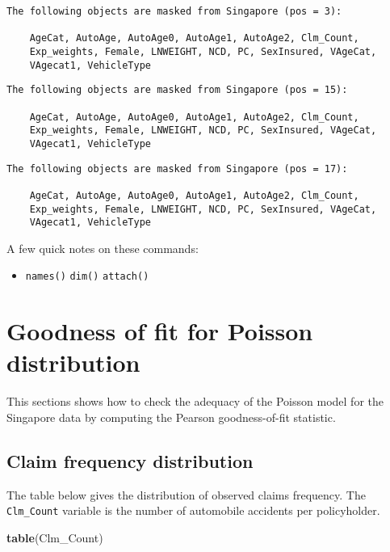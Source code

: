\documentclass[]{book}
\newenvironment{Shaded}{\begin{snugshade}}{\end{snugshade}}
\newcommand{\KeywordTok}[1]{\textcolor[rgb]{0.13,0.29,0.53}{\textbf{#1}}}
\newcommand{\NormalTok}[1]{#1}
\providecommand{\tightlist}{%
  \setlength{\itemsep}{0pt}\setlength{\parskip}{0pt}}
\theoremstyle{definition}
\theoremstyle{definition}
\theoremstyle{definition}
\theoremstyle{remark}
\begin{document}
\begin{verbatim}
The following objects are masked from Singapore (pos = 3):

    AgeCat, AutoAge, AutoAge0, AutoAge1, AutoAge2, Clm_Count,
    Exp_weights, Female, LNWEIGHT, NCD, PC, SexInsured, VAgeCat,
    VAgecat1, VehicleType
\end{verbatim}

\begin{verbatim}
The following objects are masked from Singapore (pos = 15):

    AgeCat, AutoAge, AutoAge0, AutoAge1, AutoAge2, Clm_Count,
    Exp_weights, Female, LNWEIGHT, NCD, PC, SexInsured, VAgeCat,
    VAgecat1, VehicleType
\end{verbatim}

\begin{verbatim}
The following objects are masked from Singapore (pos = 17):

    AgeCat, AutoAge, AutoAge0, AutoAge1, AutoAge2, Clm_Count,
    Exp_weights, Female, LNWEIGHT, NCD, PC, SexInsured, VAgeCat,
    VAgecat1, VehicleType
\end{verbatim}

A few quick notes on these commands:

\begin{itemize}
\tightlist
\item
  \texttt{names()} \texttt{dim()} \texttt{attach()}
\end{itemize}

\section{Goodness of fit for Poisson
distribution}\label{goodness-of-fit-for-poisson-distribution}

This sections shows how to check the adequacy of the Poisson model for
the Singapore data by computing the Pearson goodness-of-fit statistic.

\subsection{Claim frequency
distribution}\label{claim-frequency-distribution-2}

The table below gives the distribution of observed claims frequency. The
\texttt{Clm\_Count} variable is the number of automobile accidents per
policyholder.

\begin{Shaded}
\begin{Highlighting}[]
\KeywordTok{table}\NormalTok{(Clm_Count) }
\end{Highlighting}
\end{Shaded}
\end{document}
